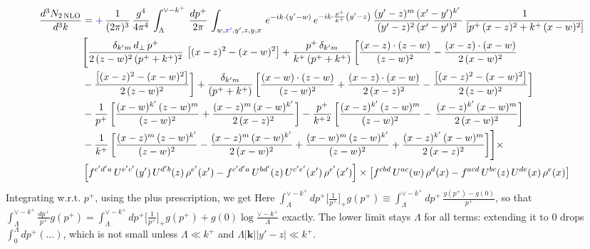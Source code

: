 \documentclass[9pt]{article}
\numberwithin{equation}{section}
\begin{document}
\begin{align}
 \frac{d^{3}N_{2\,\rm NLO}}{d^{3}k} & = {\color{blue}+}\, \frac{1}{(2\pi)^{3}}\,\frac{g^{4}}{4\pi^{4}}\,\int_{\Lambda}^{\vee-k^{+}}\, \frac{dp^{+}}{2\pi}\,\int_{w,{\color{blue}x'},y',z,y,x}\, e^{-ik\cdot (y'-w)}\,e^{-ik\cdot \frac{p^{+}}{k^{+}}\left(y'-z\right)}\, \frac{(y'-z)^{m}\,(x'-y')^{k'}\,}{(y'-z)^{2}\,(x'-y')^{2}\,}\, \frac{1}{\left[p^{+}\,(x-z)^{2}+k^{+}\,(x-w)^{2}\right]}\notag \\ & \Bigg[\frac{\delta_{k'm}\,d_{\perp}\,p^{+}}{2\,(z-w)^{2}\,(p^{+}+k^{+})^{2}}\, \left[(x-z)^{2}-(x-w)^{2}\right]+\frac{p^{+}\,\delta_{k'm}}{k^{+}\,(p^{+}+k^{+})}\,\bigg[\frac{(x-z)\cdot (z-w)}{(z-w)^{2}} -\frac{(x-z)\cdot (x-w)}{2\,(x-w)^{2}}\notag \\ & -\frac{\left[(x-z)^{2}-(x-w)^{2}\right]}{2\,(z-w)^{2}}\bigg] +\frac{\delta_{k'm}}{(p^{+}+k^{+})}\,\bigg[\frac{(x-w)\cdot (z-w)}{(z-w)^{2}}+\frac{(x-z)\cdot (x-w)}{2\,(x-z)^{2}} -\frac{\left[(x-z)^{2}-(x-w)^{2}\right]}{2\,(z-w)^{2}}\bigg]\notag \\ & -\frac{1}{p^{+}}\,\bigg[\frac{(x-w)^{k'}\,(z-w)^{m}}{(z-w)^{2}}+\frac{(x-z)^{m}\,(x-w)^{k'}}{2\,(x-z)^{2}}\bigg]-\frac{p^{+}}{k^{+\,2}}\,\bigg[\frac{(x-z)^{k'}\,(z-w)^{m}}{(z-w)^{2}} -\,\frac{(x-z)^{k'}\,(x-w)^{m}}{2\,(x-w)^{2}}\bigg]\notag \\ & -\frac{1}{k^{+}}\,\bigg[\frac{(x-z)^{m}\,(z-w)^{k'}}{(z-w)^{2}}-\frac{(x-z)^{m}\,(x-w)^{k'}}{2\,(x-w)^{2}}+\frac{(x-w)^{m}\,(z-w)^{k'}}{(z-w)^{2}} +\frac{(x-z)^{k'}\,(x-w)^{m}}{2\,(x-z)^{2}}\bigg]\Bigg]\times\,\notag \\ & \left[f^{c'd'a}\,U^{e'c'}(y')\,U^{d'b}(z)\,\rho^{e'}(x')-f^{c'd'a}\, 
    U^{bd'}(z)\,U^{c'e'}(x')\,\rho^{e'}(x')\right]\times \left[f^{cbd}\,U^{ac}(w)\,\rho^{d}(x) -f^{acd}\,U^{bc}(z)\,U^{de}(x)\,\rho^{e}(x)\right]
\end{align}
Integrating w.r.t. $p^{+}$, using the plus prescription, we get {\color{blue}Here $\int_{\Lambda}^{\vee-k^{+}}dp^{+}\big[\frac{1}{p^{+}}\big]_{+}g(p^{+})\equiv\int_{\Lambda}^{\vee-k^{+}}dp^{+}\,\frac{g(p^{+})-g(0)}{p^{+}}$, so that $\int_{\Lambda}^{\vee-k^{+}}\frac{dp^{+}}{p^{+}}g(p^{+})=\int_{\Lambda}^{\vee-k^{+}}dp^{+}\big[\frac{1}{p^{+}}\big]_{+}g(p^{+})+g(0)\log\frac{\vee-k^{+}}{\Lambda}$ exactly. The lower limit stays $\Lambda$ for all terms: extending it to $0$ drops $\int_0^\Lambda dp^+(\dots)$, which is not small unless $\Lambda\ll k^+$ and $\Lambda|\mathbf k||y'-z|\ll k^+$.}
\end{document}
